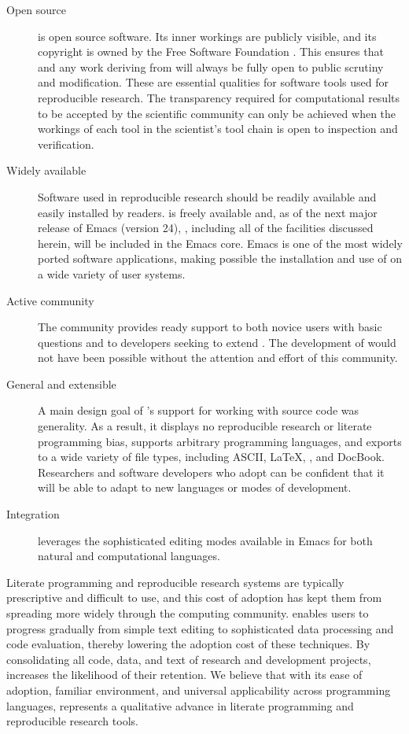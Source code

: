 \documentclass[article,shortnames]{jss}
\begin{document}
\begin{description}
\item[Open source]  is open source software.  Its inner
     workings are publicly visible, and its copyright is owned by the
     Free Software Foundation \citep{fsf}.  This ensures that
      and any work deriving from  will always be
     fully open to public scrutiny and modification.  These are
     essential qualities for software tools used for reproducible
     research.  The transparency required for computational results to
     be accepted by the scientific community can only be achieved when
     the workings of each tool in the scientist's tool chain is open to
     inspection and verification.
\item[Widely available] Software used in reproducible research should be
     readily available and easily installed by readers.   is
     freely available and, as of the next major release of Emacs
     (version 24), , including all of the facilities discussed
     herein, will be included in the Emacs core.  Emacs is one of the
     most widely ported software applications, making possible the
     installation and use of  on a wide variety of user
     systems.
\item[Active community] The  community provides ready
     support to both novice users with basic questions and to
     developers seeking to extend .  The development of
      would not have been possible without the attention and
     effort of this community.
\item[General and extensible] A main design goal of 's support
     for working with source code was generality.  As a result, it
     displays no reproducible research or literate programming bias,
     supports arbitrary programming languages, and exports to a wide
     variety of file types, including ASCII, \LaTeX{}, , and DocBook.
     Researchers and software developers who adopt  can be
     confident that it will be able to adapt to new languages or modes
     of development.
\item[Integration]  leverages the sophisticated editing modes
     available in Emacs for both natural and computational languages.
\end{description}


Literate programming and reproducible research systems are typically
prescriptive and difficult to use, and this cost of adoption has kept
them from spreading more widely through the computing community.
 enables users to progress gradually from simple text editing
to sophisticated data processing and code evaluation, thereby lowering
the adoption cost of these techniques.  By consolidating all code,
data, and text of research and development projects,  increases
the likelihood of their retention.  We believe that with its ease of
adoption, familiar environment, and universal applicability across
programming languages,  represents a qualitative advance in
literate programming and reproducible research tools.
\end{document}

